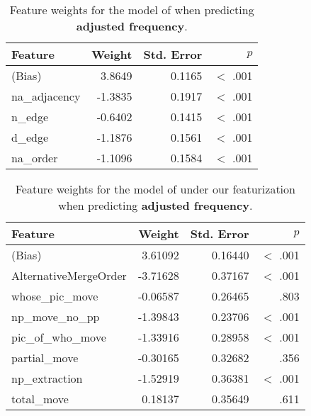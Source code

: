 \documentclass[11pt]{article}
\newcommand{\lt}{<}
\begin{document}
\begin{table}[ht!]
  \centering
  \begin{tabular}{|l|r|r|r|}
    \hline
    Feature & Weight & Std. Error & $p$ \\
    \hline
    (Bias)      &  3.8649 &     0.1165 &  $\lt$ .001 \\
    na\_adjacency &  -1.3835 &     0.1917 & $\lt$ .001 \\
    n\_edge      &  -0.6402 &     0.1415 & $\lt$ .001 \\
    d\_edge      &  -1.1876 &     0.1561 & $\lt$ .001 \\
    na\_order    &  -1.1096 &     0.1584 & $\lt$ .001 \\
    \hline
  \end{tabular}
  \caption{Feature weights for the model of \citet{cysouw2010dealing} when predicting \textbf{adjusted frequency}.}
\end{table}

\begin{table}[ht!]
  \centering
  \begin{tabular}{|l|r|r|r|}
    \hline
    Feature & Weight & Std. Error & $p$ \\
    \hline
    (Bias)              &  3.61092 &    0.16440 &  $\lt$ .001 \\
    AlternativeMergeOrder & -3.71628  &  0.37167 & $\lt$ .001 \\
    whose\_pic\_move       &  -0.06587 &  0.26465 & .803 \\
    np\_move\_no\_pp       &  -1.39843 &  0.23706 & $\lt$ .001 \\
    pic\_of\_who\_move     &  -1.33916 &  0.28958 & $\lt$ .001 \\
    partial\_move        &  -0.30165 &    0.32682 & .356 \\
    np\_extraction       &  -1.52919 &    0.36381 & $\lt$ .001 \\
    total\_move          &  0.18137 &    0.35649 & .611 \\
    \hline
  \end{tabular}
  \caption{Feature weights for the model of \citet{cinque2005deriving} under our featurization when predicting \textbf{adjusted frequency}.}
\end{table}
\end{document}
